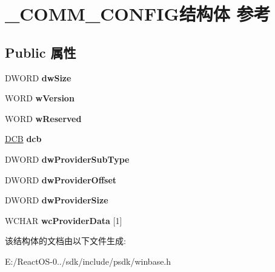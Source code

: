 \hypertarget{struct___c_o_m_m___c_o_n_f_i_g}{}\section{\+\_\+\+C\+O\+M\+M\+\_\+\+C\+O\+N\+F\+I\+G结构体 参考}
\label{struct___c_o_m_m___c_o_n_f_i_g}
\subsection*{Public 属性}
\begin{DoxyCompactItemize}
\item 
\mbox{\label{struct___c_o_m_m___c_o_n_f_i_g_a8412a61ba6f8623b0e71e05fe949f1d3}} 
D\+W\+O\+RD {\bfseries dw\+Size}
\item 
\mbox{\label{struct___c_o_m_m___c_o_n_f_i_g_a6ee1f49f3163dc1fc83a0c6555dcbe1e}} 
W\+O\+RD {\bfseries w\+Version}
\item 
\mbox{\label{struct___c_o_m_m___c_o_n_f_i_g_a78feb2e07aa48f7d03a51515b4b42eb7}} 
W\+O\+RD {\bfseries w\+Reserved}
\item 
\mbox{\label{struct___c_o_m_m___c_o_n_f_i_g_a7007a4f89a9957d4e08d24d856263450}} 
\hyperlink{struct___d_c_b}{D\+CB} {\bfseries dcb}
\item 
\mbox{\label{struct___c_o_m_m___c_o_n_f_i_g_a45dd98c67dc288dcc35c286f0127e669}} 
D\+W\+O\+RD {\bfseries dw\+Provider\+Sub\+Type}
\item 
\mbox{\label{struct___c_o_m_m___c_o_n_f_i_g_ab7705ceaedbf8e324a4f7904c842dc77}} 
D\+W\+O\+RD {\bfseries dw\+Provider\+Offset}
\item 
\mbox{\label{struct___c_o_m_m___c_o_n_f_i_g_a27f4963f753c8bb74a3f2f760da0582f}} 
D\+W\+O\+RD {\bfseries dw\+Provider\+Size}
\item 
\mbox{\label{struct___c_o_m_m___c_o_n_f_i_g_a0520900883aa58489b70ad0fe47b053f}} 
W\+C\+H\+AR {\bfseries wc\+Provider\+Data} \mbox{[}1\mbox{]}
\end{DoxyCompactItemize}


该结构体的文档由以下文件生成\+:\begin{DoxyCompactItemize}
\item 
E\+:/\+React\+O\+S-\/0../sdk/include/psdk/winbase.\+h\end{DoxyCompactItemize}
